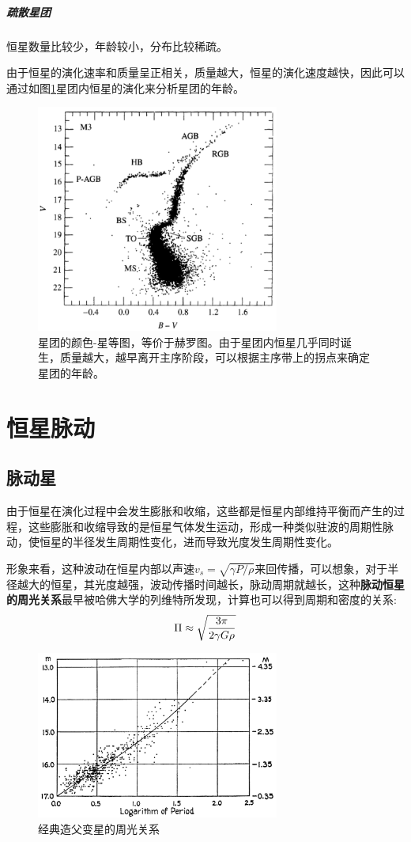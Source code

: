 \documentclass[openany]{ctexbook}
\begin{document}
\paragraph{疏散星团}
恒星数量比较少，年龄较小，分布比较稀疏。

由于恒星的演化速率和质量呈正相关，质量越大，恒星的演化速度越快，因此可以通过如图\ref{fig:cluster}星团内恒星的演化来分析星团的年龄。
\begin{figure}[hbt]
  \centering
  \includegraphics[width=8cm]{chapters/13/cluster}
  \caption{星团的颜色-星等图，等价于赫罗图。由于星团内恒星几乎同时诞生，质量越大，越早离开主序阶段，可以根据主序带上的拐点来确定星团的年龄。}
  \label{fig:cluster}
\end{figure}

\chapter{恒星脉动}
\section{脉动星}
由于恒星在演化过程中会发生膨胀和收缩，这些都是恒星内部维持平衡而产生的过程，这些膨胀和收缩导致的是恒星气体发生运动，形成一种类似驻波的周期性脉动，使恒星的半径发生周期性变化，进而导致光度发生周期性变化。

形象来看，这种波动在恒星内部以声速$v_s=\sqrt{\gamma P/\rho}$来回传播，可以想象，对于半径越大的恒星，其光度越强，波动传播时间越长，脉动周期就越长，这种\textbf{脉动恒星的周光关系}最早被哈佛大学的列维特所发现，计算也可以得到周期和密度的关系:
\begin{equation}
  \Pi\approx\sqrt{3\pi \over 2\gamma G\rho}
\end{equation}

\begin{figure}[hbt]
  \centering
  \includegraphics[width=8cm]{chapters/14/cepheid}
  \caption{经典造父变星的周光关系}
  \label{}
\end{figure}
\end{document}
